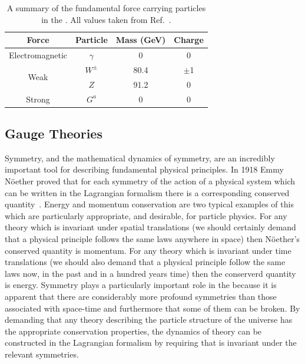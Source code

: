 \begin{table}
  \begin{tabular}{c | c c c}
  Force & Particle & Mass (GeV) & Charge \\
  \hline
  Electromagnetic & $\gamma$ & 0 & 0 \\
  \multirow{2}{*}{Weak} & $W^{\pm}$ & 80.4 & $\pm$1 \\
                        & $Z$   & 91.2 & 0 \\
  Strong                & $G^{a}$   & 0 & 0 \\   
  \end{tabular}
  \caption{A summary of the fundamental force carrying particles in the \SM. All values taken from Ref.~\cite{pdg}.}
  \label{tab:forces}
\end{table}

\subsection{Gauge Theories}

Symmetry, and the mathematical dynamics of symmetry, are an incredibly important tool for describing fundamental physical principles. In 1918 Emmy N\"{o}ether proved that for each symmetry of the action of a physical system which can be written in the Lagrangian formalism there is a corresponding conserved quantity~\cite{noether,noether_trans}. Energy and momentum conservation are two typical examples of this which are particularly appropriate, and desirable, for particle physics. For any theory which is invariant under spatial translations (we should certainly demand that a physical principle follows the same laws anywhere in space) then N\"{o}ether's conserved quantity is momentum. For any theory which is invariant under time translations (we should also demand that a physical principle follow the same laws now, in the past and in a hundred years time) then the conserverd quantity is energy. Symmetry plays a particularly important role in the \SM because it is apparent that there are considerably more profound symmetries than those associated with space-time and furthermore that some of them can be broken. By demanding that any theory describing the particle structure of the universe has the appropriate conservation properties, the dynamics of theory can be constructed in the Lagrangian formalism by requiring that is invariant under the relevant symmetries. 

